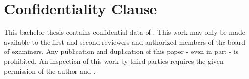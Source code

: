 \clearpage
\chapter*{Confidentiality Clause}
This bachelor thesis contains confidential data of \company.
This work may only be made available to the first and second reviewers and authorized members of the board of examiners.
Any publication and duplication of this paper - even in part - is prohibited.
An inspection of this work by third parties requires the given permission of the author and \company.
\newline

